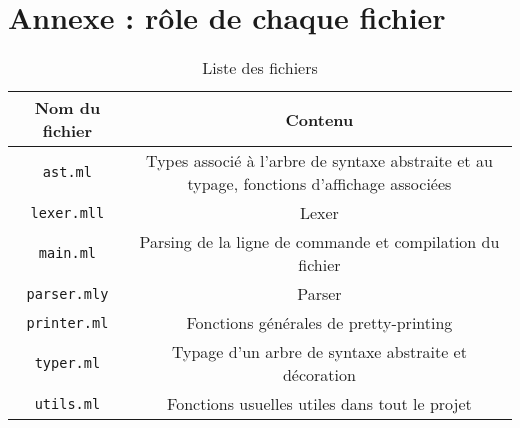 \documentclass[a4paper, 10pt, french]{article}
\newcommand{\code}[1]{\texttt{#1}}
\begin{document}
\clearpage
\section{Annexe : rôle de chaque fichier}

\begin{table}[h]
  \centering
  \begin{tabularx}{\linewidth}{|C|C|}
    \hline
    Nom du fichier & Contenu \tabularnewline
    \hline
    \code{ast.ml} & Types associé à l'arbre de syntaxe abstraite et au typage, fonctions d'affichage associées \tabularnewline
    \hline
    \code{lexer.mll} & Lexer \tabularnewline
    \hline
    \code{main.ml} & Parsing de la ligne de commande et compilation du fichier \tabularnewline
    \hline
    \code{parser.mly} & Parser \tabularnewline
    \hline
    \code{printer.ml} & Fonctions générales de pretty-printing \tabularnewline
    \hline
    \code{typer.ml} & Typage d'un arbre de syntaxe abstraite et décoration \tabularnewline
    \hline
    \code{utils.ml} & Fonctions usuelles utiles dans tout le projet \tabularnewline
    \hline
  \end{tabularx}
  \caption{Liste des fichiers}
\end{table}
\end{document}
